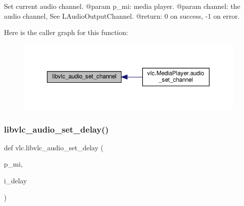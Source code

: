 \begin{DoxyVerb}Set current audio channel.
@param p_mi: media player.
@param channel: the audio channel, See L{AudioOutputChannel}.
@return: 0 on success, -1 on error.
\end{DoxyVerb}
 Here is the caller graph for this function\+:
\nopagebreak
\begin{figure}[H]
\begin{center}
\leavevmode
\includegraphics[width=350pt]{namespacevlc_abc0358f7a4053006f13577861532937c_icgraph}
\end{center}
\end{figure}
\mbox{\label{namespacevlc_a4f69c99e5eaf09175dd4353d56e934d8}} 
\subsubsection{\texorpdfstring{libvlc\+\_\+audio\+\_\+set\+\_\+delay()}{libvlc\_audio\_set\_delay()}}
{\footnotesize\ttfamily def vlc.\+libvlc\+\_\+audio\+\_\+set\+\_\+delay (\begin{DoxyParamCaption}\item[{}]{p\+\_\+mi,  }\item[{}]{i\+\_\+delay }\end{DoxyParamCaption})}

